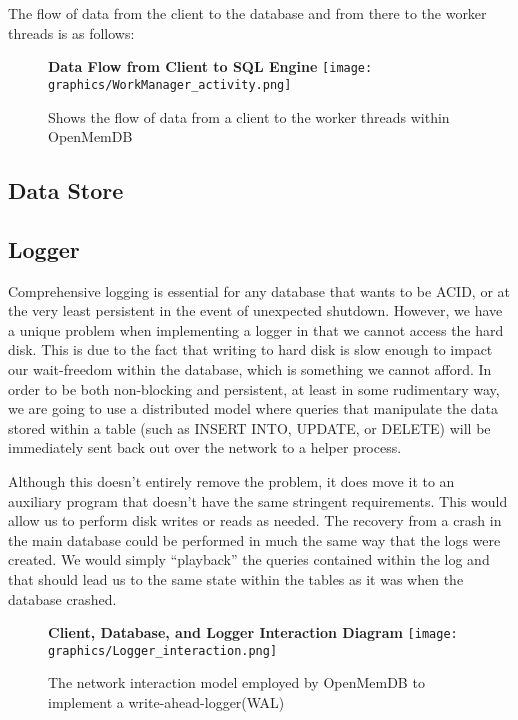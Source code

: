 \documentclass[letterpaper, 12pt]{article}
\begin{document}
  The flow of data from the client to the database and from there to the worker threads
  is as follows:
  \begin{figure}
   \centering
   \textbf{Data Flow from Client to SQL Engine}
   \texttt{[image: graphics/WorkManager\_activity.png]}
   \caption{Shows the flow of data from a client to the worker threads within OpenMemDB}
  \end{figure}
  
  \subsection{Data Store}
  
  \subsection{Logger}
  Comprehensive logging is essential for any database that wants to be ACID, or
  at the very least persistent in the event of unexpected shutdown. However, we
  have a unique problem when implementing a logger in that we cannot access the
  hard disk. This is due to the fact that writing to hard disk is slow enough to 
  impact our wait-freedom within the database, which is something we cannot afford.
  In order to be both non-blocking and persistent, at least in some rudimentary way, 
  we are going to use a distributed model where queries that manipulate the data
  stored within a table (such as INSERT INTO, UPDATE, or DELETE) will be immediately
  sent back out over the network to a helper process.
  \par\vspace{\baselineskip}
  Although this doesn't entirely remove the problem, it does move it to an auxiliary
  program that doesn't have the same stringent requirements. This would allow us to 
  perform disk writes or reads as needed. The recovery from a crash in the main database
  could be performed in much the same way that the logs were created. We would simply 
  ``playback'' the queries contained within the log and that should lead us to the same 
  state within the tables as it was when the database crashed.
  \begin{figure}
    \centering
    \textbf{Client, Database, and Logger Interaction Diagram}
    \texttt{[image: graphics/Logger\_interaction.png]}
    \caption{The network interaction model employed by OpenMemDB to implement a 
	     write-ahead-logger(WAL)}
  \end{figure}
\end{document}
